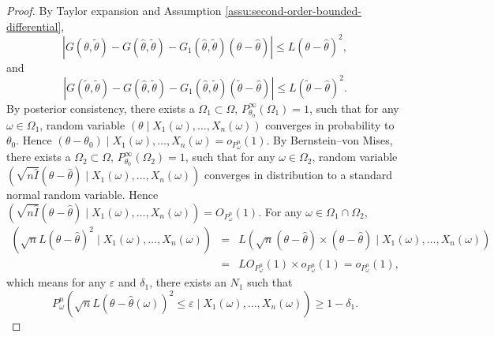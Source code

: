 \documentclass[oneside,english]{amsbook}
\numberwithin{section}{chapter}
\numberwithin{equation}{section}
\numberwithin{figure}{section}
\theoremstyle{plain}
\theoremstyle{plain}
\theoremstyle{definition}
\theoremstyle{plain}
\theoremstyle{plain}
\theoremstyle{remark}
\theoremstyle{definition}
\theoremstyle{definition}
\begin{document}
\begin{proof}
By Taylor expansion and Assumption \ref{assu:second-order-bounded-differential},
\begin{equation}
\left|G\left(\theta,\tilde{\theta}\right)-G\left(\hat{\theta},\tilde{\theta}\right)-G_{1}\left(\hat{\theta},\tilde{\theta}\right)\left(\theta-\hat{\theta}\right)\right|\le L\left(\theta-\hat{\theta}\right)^{2},\label{eq:second-lip-1}
\end{equation}
and 
\begin{equation}
\left|G\left(\tilde{\theta},\tilde{\theta}\right)-G\left(\hat{\theta},\tilde{\theta}\right)-G_{1}\left(\hat{\theta},\tilde{\theta}\right)\left(\tilde{\theta}-\hat{\theta}\right)\right|\le L\left(\tilde{\theta}-\hat{\theta}\right)^{2}.\label{eq:second-lip-2}
\end{equation}
By posterior consistency, there exists a $\Omega_{1}\subset\Omega$,
$P_{\theta_{0}}^{\infty}\left(\Omega_{1}\right)=1$, such that for
any $\omega\in\Omega_{1}$, random variable $\left(\theta\mid X_{1}\left(\omega\right),\ldots,X_{n}\left(\omega\right)\right)$
converges in probability to $\theta_{0}$. Hence $\left(\theta-\theta_{0}\right)\mid X_{1}\left(\omega\right),\ldots,X_{n}\left(\omega\right)=o_{P_{\omega}^{n}}\left(1\right)$.
By Bernstein--von Mises, there exists a $\Omega_{2}\subset\Omega$,
$P_{\theta_{0}}^{\infty}\left(\Omega_{2}\right)=1$, such that for
any $\omega\in\Omega_{2}$, random variable $\left(\sqrt{n\hat{I}}\left(\theta-\hat{\theta}\right)\mid X_{1}\left(\omega\right),\ldots,X_{n}\left(\omega\right)\right)$
converges in distribution to a standard normal random variable. Hence
$\left(\sqrt{n\hat{I}}\left(\theta-\hat{\theta}\right)\mid X_{1}\left(\omega\right),\ldots,X_{n}\left(\omega\right)\right)=O_{P_{\omega}^{n}}\left(1\right).$
For any $\omega\in\Omega_{1}\cap\Omega_{2}$, 
\begin{eqnarray*}
\left(\sqrt{n}L\left(\theta-\hat{\theta}\right)^{2}\mid X_{1}\left(\omega\right),\ldots,X_{n}\left(\omega\right)\right) & = & L\left(\sqrt{n}\left(\theta-\hat{\theta}\right)\times\left(\theta-\hat{\theta}\right)\mid X_{1}\left(\omega\right),\ldots,X_{n}\left(\omega\right)\right)\\
 & = & LO_{P_{\omega}^{n}}\left(1\right)\times o_{P_{\omega}^{n}}\left(1\right)=o_{P_{\omega}^{n}}\left(1\right),
\end{eqnarray*}
which means for any $\varepsilon$ and $\delta_{1}$, there exists
an $N_{1}$ such that 
\[
P_{\omega}^{n}\left(\sqrt{n}L\left(\theta-\hat{\theta}\left(\omega\right)\right)^{2}\le\varepsilon\mid X_{1}\left(\omega\right),\ldots,X_{n}\left(\omega\right)\right)\ge1-\delta_{1}.
\]
\end{proof}
\end{document}
